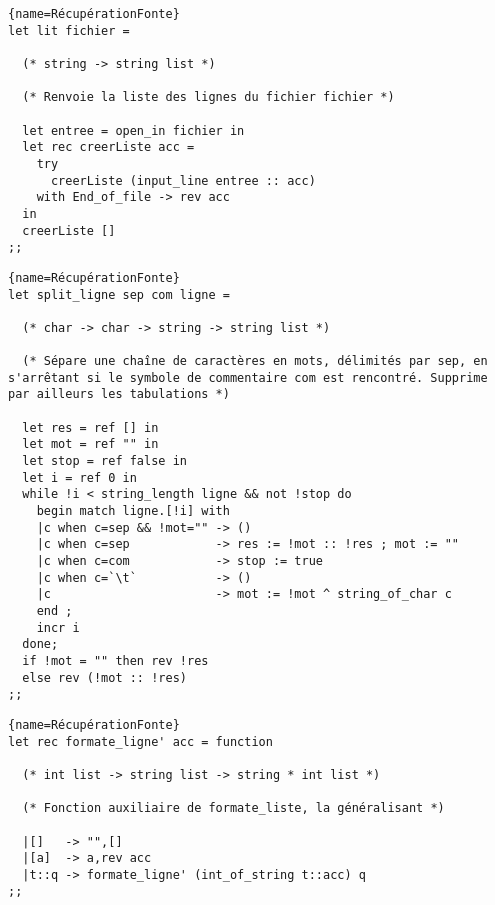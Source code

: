 \documentclass[10pt,twoside,a4paper]{article}
\begin{document}
\begin{lstlisting}{name=RécupérationFonte}
let lit fichier =

  (* string -> string list *)
  
  (* Renvoie la liste des lignes du fichier fichier *)
  
  let entree = open_in fichier in
  let rec creerListe acc =
    try
      creerListe (input_line entree :: acc)
    with End_of_file -> rev acc
  in
  creerListe []
;;
\end{lstlisting}
\pagebreak
\begin{lstlisting}{name=RécupérationFonte}
let split_ligne sep com ligne =

  (* char -> char -> string -> string list *)

  (* Sépare une chaîne de caractères en mots, délimités par sep, en s'arrêtant si le symbole de commentaire com est rencontré. Supprime par ailleurs les tabulations *)
  
  let res = ref [] in
  let mot = ref "" in
  let stop = ref false in
  let i = ref 0 in
  while !i < string_length ligne && not !stop do
    begin match ligne.[!i] with
    |c when c=sep && !mot="" -> ()
    |c when c=sep            -> res := !mot :: !res ; mot := ""
    |c when c=com            -> stop := true
    |c when c=`\t`           -> ()
    |c                       -> mot := !mot ^ string_of_char c
    end ;
    incr i
  done;
  if !mot = "" then rev !res
  else rev (!mot :: !res)
;;
\end{lstlisting}

\begin{lstlisting}{name=RécupérationFonte}
let rec formate_ligne' acc = function

  (* int list -> string list -> string * int list *)

  (* Fonction auxiliaire de formate_liste, la généralisant *)

  |[]   -> "",[]
  |[a]  -> a,rev acc
  |t::q -> formate_ligne' (int_of_string t::acc) q
;;
\end{lstlisting}
\end{document}

